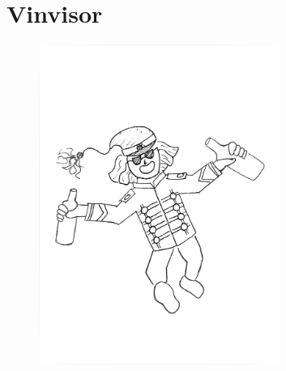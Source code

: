 
\chapter{Vinvisor}


\begin{figure}[H]
    \centering
    \includegraphics[width=0.7\textwidth]{vin_laseri.jpg}
\end{figure}

\newpage






\newpage





\newpage